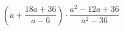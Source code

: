 \begin{ex}[type=expression]
	\begin{condition}
		\(\left( a+\dfrac{18a+36}{a-6} \right)\cdot\dfrac{a^2-12a+36}{a^2-36}\)
	\end{condition}
\end{ex}